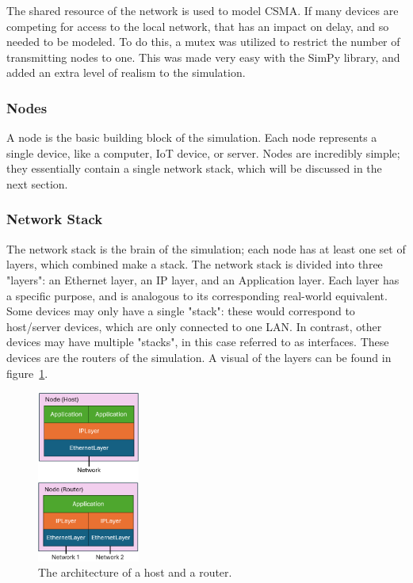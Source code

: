 \documentclass[conference]{IEEEtran}
\begin{document}
The shared resource of the network is used to model CSMA.
If many devices are competing for access to the local network, that has an impact on delay, and so needed to be modeled.
To do this, a mutex was utilized to restrict the number of transmitting nodes to one.
This was made very easy with the SimPy library, and added an extra level of realism to the simulation.

    \subsubsection{Nodes}
A node is the basic building block of the simulation.
Each node represents a single device, like a computer, IoT device, or server.
Nodes are incredibly simple; they essentially contain a single network stack, which will be discussed in the next section.

    \subsubsection{Network Stack}
The network stack is the brain of the simulation; each node has at least one set of layers, which combined make a stack.
The network stack is divided into three "layers": an Ethernet layer, an IP layer, and an Application layer.
Each layer has a specific purpose, and is analogous to its corresponding real-world equivalent.
Some devices may only have a single "stack": these would correspond to host/server devices, which are only connected to one LAN.
In contrast, other devices may have multiple "stacks", in this case referred to as interfaces.
These devices are the routers of the simulation.
A visual of the layers can be found in figure~\ref{fig:combo}.

\begin{figure}[htbp]
    \centering
    \includegraphics[width=0.3\textwidth]{../img/combo}
    \caption{The architecture of a host and a router.}
    \label{fig:combo}
\end{figure}
\end{document}
